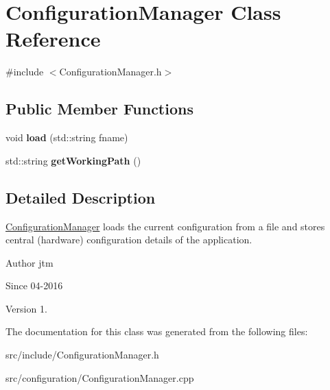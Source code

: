 \hypertarget{classConfigurationManager}{\section{Configuration\-Manager Class Reference}
\label{classConfigurationManager}
}


{\ttfamily \#include $<$Configuration\-Manager.\-h$>$}

\subsection*{Public Member Functions}
\begin{DoxyCompactItemize}
\item 
\hypertarget{classConfigurationManager_a066a7ae7e01b7ba6b62782fd3eeffaab}{void {\bfseries load} (std\-::string fname)}\label{classConfigurationManager_a066a7ae7e01b7ba6b62782fd3eeffaab}

\item 
\hypertarget{classConfigurationManager_ab4fac4121f154fb83b67a727b650c436}{std\-::string {\bfseries get\-Working\-Path} ()}\label{classConfigurationManager_ab4fac4121f154fb83b67a727b650c436}

\end{DoxyCompactItemize}


\subsection{Detailed Description}
\hyperlink{classConfigurationManager}{Configuration\-Manager} loads the current configuration from a file and stores central (hardware) configuration details of the application.

\begin{DoxyAuthor}{Author}
jtm 
\end{DoxyAuthor}
\begin{DoxySince}{Since}
04-\/2016 
\end{DoxySince}
\begin{DoxyVersion}{Version}
1. 
\end{DoxyVersion}


The documentation for this class was generated from the following files\-:\begin{DoxyCompactItemize}
\item 
src/include/Configuration\-Manager.\-h\item 
src/configuration/Configuration\-Manager.\-cpp\end{DoxyCompactItemize}
